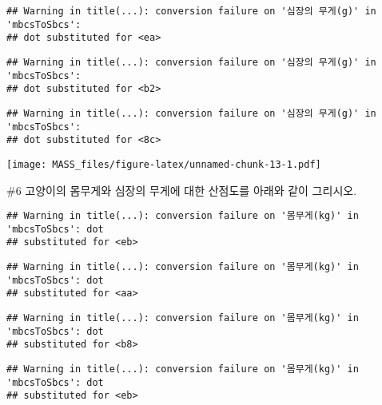 \documentclass[
]{article}
\newenvironment{Shaded}{\begin{snugshade}}{\end{snugshade}}
\newcommand{\AttributeTok}[1]{\textcolor[rgb]{0.13,0.29,0.53}{#1}}
\newcommand{\DecValTok}[1]{\textcolor[rgb]{0.00,0.00,0.81}{#1}}
\newcommand{\FunctionTok}[1]{\textcolor[rgb]{0.13,0.29,0.53}{\textbf{#1}}}
\newcommand{\NormalTok}[1]{#1}
\newcommand{\SpecialCharTok}[1]{\textcolor[rgb]{0.81,0.36,0.00}{\textbf{#1}}}
\newcommand{\StringTok}[1]{\textcolor[rgb]{0.31,0.60,0.02}{#1}}
\begin{document}
\begin{verbatim}
## Warning in title(...): conversion failure on '심장의 무게(g)' in 'mbcsToSbcs':
## dot substituted for <ea>
\end{verbatim}

\begin{verbatim}
## Warning in title(...): conversion failure on '심장의 무게(g)' in 'mbcsToSbcs':
## dot substituted for <b2>
\end{verbatim}

\begin{verbatim}
## Warning in title(...): conversion failure on '심장의 무게(g)' in 'mbcsToSbcs':
## dot substituted for <8c>
\end{verbatim}

\texttt{[image: MASS\_files/figure-latex/unnamed-chunk-13-1.pdf]}

\#6 고양이의 몸무게와 심장의 무게에 대한 산점도를 아래와 같이 그리시오.

\begin{Shaded}
\end{Shaded}

\begin{verbatim}
## Warning in title(...): conversion failure on '몸무게(kg)' in 'mbcsToSbcs': dot
## substituted for <eb>
\end{verbatim}

\begin{verbatim}
## Warning in title(...): conversion failure on '몸무게(kg)' in 'mbcsToSbcs': dot
## substituted for <aa>
\end{verbatim}

\begin{verbatim}
## Warning in title(...): conversion failure on '몸무게(kg)' in 'mbcsToSbcs': dot
## substituted for <b8>
\end{verbatim}

\begin{verbatim}
## Warning in title(...): conversion failure on '몸무게(kg)' in 'mbcsToSbcs': dot
## substituted for <eb>
\end{verbatim}
\end{document}
